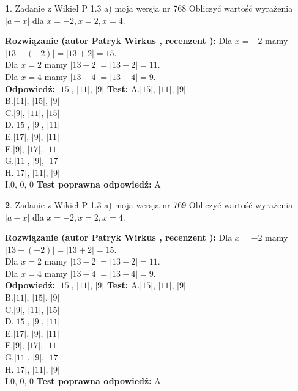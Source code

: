 \documentclass[12pt, a4paper]{article}
\theoremstyle{definition} %
\newtheorem{zad}{}
\newcommand{\zadStart}[1]{\begin{zad}#1\newline}
\newcommand{\zadStop}{\end{zad}}
\newcommand{\rozwStart}[2]{\noindent \textbf{Rozwiązanie (autor #1 , recenzent #2): }\newline}
\newcommand{\rozwStop}{\newline}
\newcommand{\odpStart}{\noindent \textbf{Odpowiedź:}\newline}
\newcommand{\odpStop}{\newline}
\newcommand{\testStart}{\noindent \textbf{Test:}\newline}
\newcommand{\testStop}{\newline}
\newcommand{\kluczStart}{\noindent \textbf{Test poprawna odpowiedź:}\newline}
\newcommand{\kluczStop}{\newline}
\begin{document}
\zadStart{Zadanie z Wikieł P 1.3 a) moja wersja nr 768}
Obliczyć wartość wyrażenia $|a - x|$ dla $x=-2,x=2,x=4$.
\zadStop
\rozwStart{Patryk Wirkus}{}
Dla $x = -2$ mamy $|13 - (-2)| = |13 + 2| = 15$.\\
Dla $x = 2$ mamy $|13 - 2| = |13 - 2| = 11$.\\
Dla $x = 4$ mamy $|13 - 4| = |13 - 4| = 9$.\\
\rozwStop
\odpStart
$|15|$, $|11|$, $|9|$
\odpStop
\testStart
A.$|15|$, $|11|$, $|9|$\\
B.$|11|$, $|15|$, $|9|$\\
C.$|9|$, $|11|$, $|15|$\\
D.$|15|$, $|9|$, $|11|$\\
E.$|17|$, $|9|$, $|11|$\\
F.$|9|$, $|17|$, $|11|$\\
G.$|11|$, $|9|$, $|17|$\\
H.$|17|$, $|11|$, $|9|$\\
I.$0$, $0$, $0$
\testStop
\kluczStart
A
\kluczStop



\zadStart{Zadanie z Wikieł P 1.3 a) moja wersja nr 769}
Obliczyć wartość wyrażenia $|a - x|$ dla $x=-2,x=2,x=4$.
\zadStop
\rozwStart{Patryk Wirkus}{}
Dla $x = -2$ mamy $|13 - (-2)| = |13 + 2| = 15$.\\
Dla $x = 2$ mamy $|13 - 2| = |13 - 2| = 11$.\\
Dla $x = 4$ mamy $|13 - 4| = |13 - 4| = 9$.\\
\rozwStop
\odpStart
$|15|$, $|11|$, $|9|$
\odpStop
\testStart
A.$|15|$, $|11|$, $|9|$\\
B.$|11|$, $|15|$, $|9|$\\
C.$|9|$, $|11|$, $|15|$\\
D.$|15|$, $|9|$, $|11|$\\
E.$|17|$, $|9|$, $|11|$\\
F.$|9|$, $|17|$, $|11|$\\
G.$|11|$, $|9|$, $|17|$\\
H.$|17|$, $|11|$, $|9|$\\
I.$0$, $0$, $0$
\testStop
\kluczStart
A
\kluczStop
\end{document}
